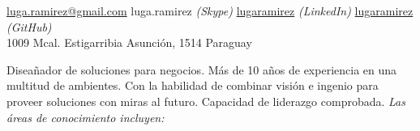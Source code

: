 \documentclass[10pt,a4paper]{article} %
\begin{document}
 



\noindent\href{mailto:luga.ramirez@gmail.com}{luga.ramirez@gmail.com}
\bull luga.ramirez \textit{(Skype)}
\bull \href{https://www.linkedin.com/in/lugaramirez/}{lugaramirez} \textit{(LinkedIn)}
\bull \href{https://github.com/lugaramirez}{lugaramirez} \textit{(GitHub)}\\
1009 Mcal. Estigarribia
\bull Asunción, 1514
\bull Paraguay %

\spacedhrule{0.9em}{-0.4em} %



Diseañador de soluciones para negocios. Más de 10 años de experiencia en una multitud de ambientes. Con la habilidad de combinar visión e ingenio para proveer soluciones con miras al futuro. Capacidad de liderazgo comprobada. \textit{Las áreas de conocimiento incluyen:}

\vspace{-1em} %
\begin{multicols}{2}  %
{}
\end{multicols}
\end{document}
